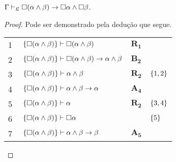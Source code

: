 \vspace{\baselineskip}
\begin{tcolorbox}[enhanced jigsaw, breakable, sharp corners, colframe=black, colback=white, boxrule=0.5pt, left=1.5mm, right=1.5mm, top=1.5mm, bottom=1.5mm]
    \begin{lemma}\label{necessity.conjunction.distribution}
        $\Gamma\mathrel{\vdash}_\mathfrak{L}\Box(\alpha\wedge\beta)\to\Box\alpha\wedge\Box\beta$.
        \begin{proof}
        Pode ser demonstrado pela dedução que segue.

        \vspace{0.5\baselineskip}
        \footnotesize
        \setlength{\rowskip}{0.5\baselineskip}
        \begin{xltabular}{\textwidth}{r | X l l}
            \scriptsize{\phantom{0}1}\phantom{ } & $\ \set{\nec(\alpha\wedge\beta)}\vdash\nec(\alpha\wedge\beta)$                            & $\hyperref[modal.rule.1]{\mathbf{R_1}}$        & \\[\rowskip]
            \scriptsize{\phantom{0}2}\phantom{ } & $\ \set{\nec(\alpha\wedge\beta)}\vdash\nec(\alpha\wedge\beta)\to\alpha\wedge\beta$        & $\hyperref[modal.axiom.modal.2]{\mathbf{B_2}}$ & \\[\rowskip]
            \scriptsize{\phantom{0}3}\phantom{ } & $\ \set{\nec(\alpha\wedge\beta)}\vdash\alpha\wedge\beta$                                  & $\hyperref[modal.rule.2]{\mathbf{R_2}}$        & $\left\{1,2\right\}$\\[\rowskip]
            \scriptsize{\phantom{0}4}\phantom{ } & $\ \set{\nec(\alpha\wedge\beta)}\vdash\alpha\wedge\beta\to\alpha$                         & $\hyperref[modal.axiom.4]{\mathbf{A_4}}$       & \\[\rowskip]
            \scriptsize{\phantom{0}5}\phantom{ } & $\ \set{\nec(\alpha\wedge\beta)}\vdash\alpha$                                             & $\hyperref[modal.rule.2]{\mathbf{R_2}}$        & $\left\{3,4\right\}$\\[\rowskip]
            \scriptsize{\phantom{0}6}\phantom{ } & $\ \set{\nec(\alpha\wedge\beta)}\vdash\nec\alpha$                                         & \phantom{1}           & $\left\{5\right\}$\\[\rowskip]
            \scriptsize{\phantom{0}7}\phantom{ } & $\ \set{\nec(\alpha\wedge\beta)}\vdash\alpha\wedge\beta\to\beta$                          & $\hyperref[modal.axiom.5]{\mathbf{A_5}}$       & \\[\rowskip]

\end{xltabular}
\end{proof}
\end{lemma}
\end{tcolorbox}
